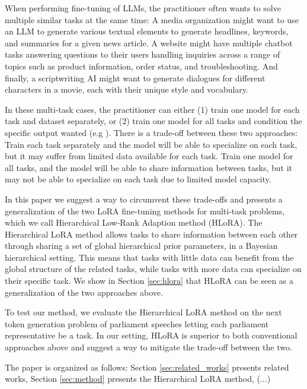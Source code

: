 \documentclass{article}
\begin{document}
When performing fine-tuning of LLMs, the practitioner often wants to solve multiple similar tasks at the same time: 
A media organization might want to use an LLM to generate various textual elements to generate headlines, keywords, and summaries for a given news article. 
A website might have multiple chatbot tasks answering questions to their users handling inquiries across a range of topics such as product information, order status, and troubleshooting.
And finally, a scriptwriting AI might want to generate dialogues for different characters in a movie, each with their unique style and vocabulary.

In these multi-task cases, the practitioner can either (1) train one model for each task and dataset separately, or (2) train one model for all tasks and condition the specific output wanted (e.g \cite{Raffel2019}).
There is a trade-off between these two approaches: Train each task separately and the model will be able to specialize on each task, but it may suffer from limited data available for each task. Train one model for all tasks, and the model will be able to share information between tasks, but it may not be able to specialize on each task due to limited model capacity.

In this paper we suggest a way to circumvent these trade-offs and presents a generalization of the two LoRA fine-tuning methods for multi-task problems, which we call Hierarchical Low-Rank Adaption method (HLoRA).
The Hierarchical LoRA method allows tasks to share information between each other through sharing a set of global hierarchical prior parameters, in a Bayesian hierarchical setting. 
This means that tasks with little data can benefit from the global structure of the related tasks, while tasks with more data can specialize on their specific task.
We show in Section \ref{sec:hlora} that HLoRA can be seen as a generalization of the two approaches above.

To test our method, we evaluate the Hierarchical LoRA method on the next token generation problem of parliament speeches letting each parliament representative be a task. In our setting, HLoRA is superior to both conventional approaches above and suggest a way to mitigate the trade-off between the two.

The paper is organized as follows: Section \ref{sec:related_works} presents related works, Section \ref{sec:method} presents the Hierarchical LoRA method, (...)
\end{document}
